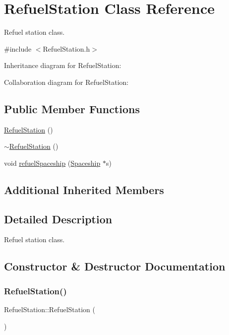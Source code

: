 \hypertarget{classRefuelStation}{}\section{Refuel\+Station Class Reference}
\label{classRefuelStation}


Refuel station class.  




{\ttfamily \#include $<$Refuel\+Station.\+h$>$}



Inheritance diagram for Refuel\+Station\+:


Collaboration diagram for Refuel\+Station\+:
\subsection*{Public Member Functions}
\begin{DoxyCompactItemize}
\item 
\hyperlink{classRefuelStation_a3ab9b746bd1e7bfaa9eff06567d6a1d4}{Refuel\+Station} ()
\item 
\hyperlink{classRefuelStation_afc0ebc020ef08d8a6a2096bdb2f3e314}{$\sim$\+Refuel\+Station} ()
\item 
void \hyperlink{classRefuelStation_a1b14f9c75c883e3288c52a32b2bbd8a4}{refuel\+Spaceship} (\hyperlink{classSpaceship}{Spaceship} $\ast$s)
\end{DoxyCompactItemize}
\subsection*{Additional Inherited Members}


\subsection{Detailed Description}
Refuel station class. 

\subsection{Constructor \& Destructor Documentation}
\mbox{\label{classRefuelStation_a3ab9b746bd1e7bfaa9eff06567d6a1d4}} 
\subsubsection{\texorpdfstring{Refuel\+Station()}{RefuelStation()}}
{\footnotesize\ttfamily Refuel\+Station\+::\+Refuel\+Station (\begin{DoxyParamCaption}{ }\end{DoxyParamCaption})}

